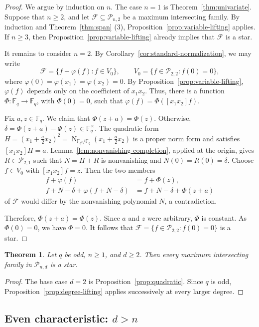 \documentclass[12pt,reqno]{amsart}
\newtheorem{thm}{Theorem}[section]
\theoremstyle{definition}
\newcommand{\Nm}{\operatorname{N}}
\newcommand{\F}{\mathbb{F}}
\newcommand{\cF}{\mathcal F}
\newcommand{\cP}{\mathcal P}
\begin{document}
\begin{proof}
We argue by induction on $n$. The case $n=1$ is
Theorem~\ref{thm:univariate}. Suppose that $n\geq2$, and let
$\cF\subseteq\cP_{n,2}$ be a maximum intersecting family.
By induction and Theorem~\ref{thm:span} (3),
Proposition~\ref{prop:variable-lifting} applies. If $n\geq 3$, then
Proposition~\ref{prop:variable-lifting} already implies that $\cF$ is a star.

It remains to consider $n=2$. By
Corollary~\ref{cor:standard-normalization}, we may write
\[
\cF=\{f+\varphi(f):f\in V_0\},
\qquad
V_0=\{f\in\cP_{2,2}:f(0)=0\},
\]
where $\varphi(0)=\varphi(x_1)=\varphi(x_2)=0$.
By Proposition~\ref{prop:variable-lifting}, $\varphi(f)$ depends only on the coefficient of $x_1x_2$. Thus, there is a function
$\Phi\colon\F_q\to\F_q$, with $\Phi(0)=0$, such that $\varphi(f)=\Phi([x_1x_2]f)$. 

Fix $a,z\in\F_q$. We claim that $\Phi(z+a)=\Phi(z)$. Otherwise, $\delta=\Phi(z+a)-\Phi(z)\in\F_q^\times$. The quadratic form $H=\left(x_1+\frac a2x_2\right)^2=\Nm_{\F_{q^2}/\F_q}\left(x_1+\frac a2x_2\right)$ is a proper norm form and satisfies $[x_1x_2]H=a$. Lemma~\ref{lem:nonvanishing-completion}, applied at the origin,
gives $R\in\cP_{2,1}$ such that $N=H+R$ is nonvanishing and $N(0)=R(0)=\delta$. Choose $f\in V_0$ with $[x_1x_2]f=z$. Then the two members
\[
\begin{aligned}
f+\varphi(f)
  &=f+\Phi(z),\\
f+N-\delta+\varphi(f+N-\delta)
  &=f+N-\delta+\Phi(z+a)
\end{aligned}
\]
of $\cF$ would differ by the nonvanishing polynomial $N$, a contradiction.

Therefore, $\Phi(z+a)=\Phi(z)$. Since $a$ and $z$ were arbitrary, $\Phi$ is constant. As
$\Phi(0)=0$, we have $\Phi=0$. It follows that $\cF=\{f\in\cP_{2,2}:f(0)=0\}$ is a star.
\end{proof}
\begin{thm}
\label{thm:odd-pairwise}
Let $q$ be odd, $n\geq1$, and $d\geq2$. Then every maximum intersecting family in $\cP_{n,d}$ is a star.
\end{thm}

\begin{proof}
The base case $d=2$ is Proposition~\ref{prop:quadratic}. Since $q$ is
odd, Proposition~\ref{prop:degree-lifting} applies successively at
every larger degree.
\end{proof}

\subsection{Even characteristic: \texorpdfstring{$d>n$}{d > n}}
\label{subsec:even-supercritical}
\end{document}
